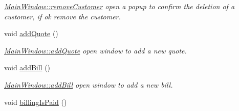 \begin{DoxyCompactItemize}
\begin{DoxyCompactList}\small\item\em \hyperlink{classGui_1_1MainWindow_ab86dd052f06fb56dbd77e3ae4c228796}{Main\+Window\+::remove\+Customer} open a popup to confirm the deletion of a customer, if ok remove the customer. \end{DoxyCompactList}\item 
void \hyperlink{classGui_1_1MainWindow_aa7d3f2553b55d74885ad7f19ed403dfd}{add\+Quote} ()
\begin{DoxyCompactList}\small\item\em \hyperlink{classGui_1_1MainWindow_aa7d3f2553b55d74885ad7f19ed403dfd}{Main\+Window\+::add\+Quote} open window to add a new quote. \end{DoxyCompactList}\item 
void \hyperlink{classGui_1_1MainWindow_a4b9d5d9bee4b7a5f7d8cfe04d1222315}{add\+Bill} ()
\begin{DoxyCompactList}\small\item\em \hyperlink{classGui_1_1MainWindow_a4b9d5d9bee4b7a5f7d8cfe04d1222315}{Main\+Window\+::add\+Bill} open window to add a new bill. \end{DoxyCompactList}\item 
\hypertarget{classGui_1_1MainWindow_a149c8e2210fa249c0510e1f607079fde}{}void \hyperlink{classGui_1_1MainWindow_a149c8e2210fa249c0510e1f607079fde}{billing\+Is\+Paid} ()\label{classGui_1_1MainWindow_a149c8e2210fa249c0510e1f607079fde}


\end{DoxyCompactItemize}
